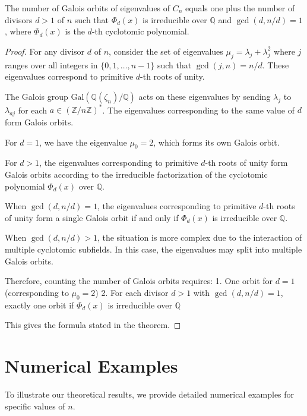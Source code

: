 \begin{theorem}
The number of Galois orbits of eigenvalues of $C_n$ equals one plus the number of divisors $d > 1$ of $n$ such that $\Phi_d(x)$ is irreducible over $\mathbb{Q}$ and $\gcd(d, n/d) = 1$, where $\Phi_d(x)$ is the $d$-th cyclotomic polynomial.
\end{theorem}

\begin{proof}
For any divisor $d$ of $n$, consider the set of eigenvalues $\mu_j = \lambda_j + \lambda_j^2$ where $j$ ranges over all integers in $\{0, 1, \ldots, n-1\}$ such that $\gcd(j, n) = n/d$. These eigenvalues correspond to primitive $d$-th roots of unity.

The Galois group $\text{Gal}(\mathbb{Q}(\zeta_n)/\mathbb{Q})$ acts on these eigenvalues by sending $\lambda_j$ to $\lambda_{aj}$ for each $a \in (\mathbb{Z}/n\mathbb{Z})^*$. The eigenvalues corresponding to the same value of $d$ form Galois orbits.

For $d = 1$, we have the eigenvalue $\mu_0 = 2$, which forms its own Galois orbit.

For $d > 1$, the eigenvalues corresponding to primitive $d$-th roots of unity form Galois orbits according to the irreducible factorization of the cyclotomic polynomial $\Phi_d(x)$ over $\mathbb{Q}$.

When $\gcd(d, n/d) = 1$, the eigenvalues corresponding to primitive $d$-th roots of unity form a single Galois orbit if and only if $\Phi_d(x)$ is irreducible over $\mathbb{Q}$.

When $\gcd(d, n/d) > 1$, the situation is more complex due to the interaction of multiple cyclotomic subfields. In this case, the eigenvalues may split into multiple Galois orbits.

Therefore, counting the number of Galois orbits requires:
1. One orbit for $d = 1$ (corresponding to $\mu_0 = 2$)
2. For each divisor $d > 1$ with $\gcd(d, n/d) = 1$, exactly one orbit if $\Phi_d(x)$ is irreducible over $\mathbb{Q}$

This gives the formula stated in the theorem.
\end{proof}

\section{Numerical Examples}

To illustrate our theoretical results, we provide detailed numerical examples for specific values of $n$.

